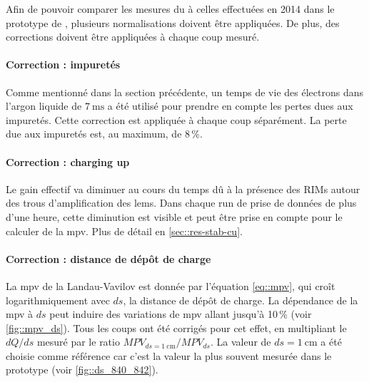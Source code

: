         Afin de pouvoir comparer les mesures du \TOO{} à celles effectuées en 2014 dans le prototype de \threeL{}, plusieurs normalisations doivent être appliquées. De plus, des corrections doivent être appliquées à chaque coup mesuré.

        \paragraph{Correction : impuretés} Comme mentionné dans la section précédente, un temps de vie des électrons dans l'argon liquide de $\SI{7}{\milli\second}$ a été utilisé pour prendre en compte les pertes dues aux impuretés. Cette correction est appliquée à chaque coup séparément. La perte due aux impuretés est, au maximum, de 8\,\%.

        \paragraph{Correction : charging up} Le gain effectif va diminuer au cours du temps dû à la présence des RIMs autour des trous d'amplification des \glspl{lem}. Dans chaque run de prise de données de plus d'une heure, cette diminution est visible et peut être prise en compte pour le calculer de la \gls{mpv}. Plus de détail en \autoref{sec::res-stab-cu}.

        \paragraph{Correction : distance de dépôt de charge} La \gls{mpv} de la Landau-Vavilov est donnée par l'équation \eqref{eq::mpv}, qui croît logarithmiquement avec $ds$, la distance de dépôt de charge. La dépendance de la \gls{mpv} à $ds$ peut induire des variations de \gls{mpv} allant jusqu'à 10\,\% (voir \autoref{fig::mpv_ds}). Tous les coups ont été corrigés pour cet effet, en multipliant le $dQ/ds$ mesuré par le ratio $MPV_{ds=\SI{1}{\centi\meter}}/MPV_{ds}$. La valeur de $ds=\SI{1}{\centi\meter}$ a été choisie comme référence car c'est la valeur la plus souvent mesurée dans le prototype (voir \autoref{fig::ds_840_842}).

